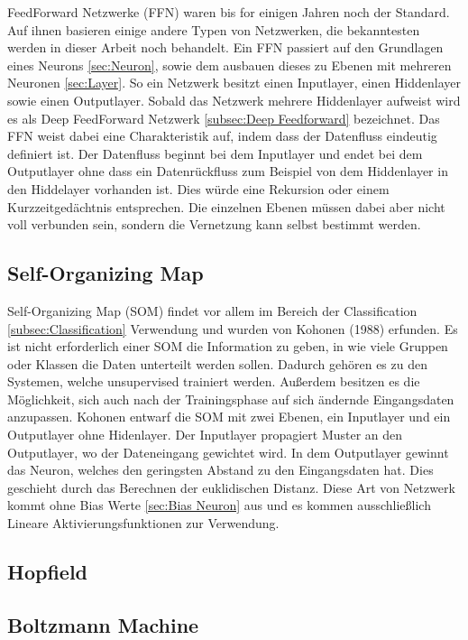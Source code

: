 FeedForward Netzwerke (FFN) waren bis for einigen Jahren noch der Standard.
Auf ihnen basieren einige andere Typen von Netzwerken, die bekanntesten werden in dieser Arbeit noch behandelt.
Ein FFN passiert auf den Grundlagen eines Neurons \ref{sec:Neuron}, sowie dem ausbauen dieses zu Ebenen mit mehreren Neuronen \ref{sec:Layer}.
So ein Netzwerk besitzt einen Inputlayer, einen Hiddenlayer sowie einen Outputlayer.
Sobald das Netzwerk mehrere Hiddenlayer aufweist wird es als Deep FeedForward Netzwerk \ref{subsec:Deep Feedforward} bezeichnet.
Das FFN weist dabei eine Charakteristik auf, indem dass der Datenfluss eindeutig definiert ist. 
Der Datenfluss beginnt bei dem Inputlayer und endet bei dem Outputlayer ohne dass ein Datenrückfluss zum Beispiel von dem Hiddenlayer in den Hiddelayer vorhanden ist.
Dies würde eine Rekursion oder einem Kurzzeitgedächtnis entsprechen.
Die einzelnen Ebenen müssen dabei aber nicht voll verbunden sein, sondern die Vernetzung kann selbst bestimmt werden.

\subsection{Self-Organizing Map}

Self-Organizing Map (SOM) findet vor allem im Bereich der Classification  \ref{subsec:Classification} Verwendung und wurden von Kohonen (1988) erfunden. 
Es ist nicht erforderlich einer SOM die Information zu geben, in wie viele Gruppen oder Klassen die Daten unterteilt werden sollen. 
Dadurch gehören es zu den Systemen, welche unsupervised trainiert werden. 
Außerdem besitzen es die Möglichkeit, sich auch nach der Trainingsphase auf sich ändernde Eingangsdaten anzupassen. 
Kohonen entwarf die SOM mit zwei Ebenen, ein Inputlayer und ein Outputlayer ohne Hidenlayer. 
Der Inputlayer propagiert Muster an den Outputlayer, wo der Dateneingang gewichtet wird. 
In dem Outputlayer gewinnt das Neuron, welches den geringsten Abstand zu den Eingangsdaten hat.
Dies geschieht durch das Berechnen der euklidischen Distanz. 
Diese Art von Netzwerk kommt ohne Bias Werte \ref{sec:Bias Neuron} aus und es kommen ausschließlich Lineare Aktivierungsfunktionen zur Verwendung.



\subsection{Hopfield}

\subsection{Boltzmann Machine}

